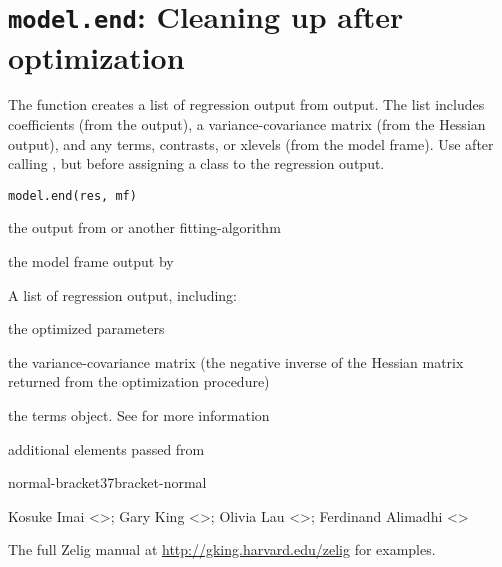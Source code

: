  \section{{\tt model.end}: Cleaning up after optimization}\label{ss:model.end}
\begin{Description}\relax
The  function creates a list of regression output from  
output.  The list includes coefficients (from the   output), a 
variance-covariance matrix (from the  Hessian output), and any terms, contrasts, or 
xlevels (from the model frame).  Use  after calling , but before 
assigning a 
class to the regression output.
\end{Description}
\begin{Usage}
\begin{verbatim}
model.end(res, mf)
\end{verbatim}
\end{Usage}
\begin{Arguments}
\begin{ldescription}
\item[\code{res}] the output from  or another fitting-algorithm
\item[\code{mf}] the model frame output by 
\end{ldescription}
\end{Arguments}
\begin{Value}
A list of regression output, including: 
\begin{ldescription}
\item[\code{coefficients}] the optimized parameters
\item[\code{variance}] the variance-covariance matrix (the negative
inverse of the Hessian matrix returned from the optimization
procedure)
\item[\code{terms}] the terms object.  See 
for more information
\item[\code{...}] additional elements passed from 
\end{ldescription}

normal-bracket37bracket-normal
\end{Value}
\begin{Author}\relax
Kosuke Imai <>; Gary King
<>; Olivia Lau <>; Ferdinand Alimadhi
<>
\end{Author}
\begin{SeeAlso}\relax
The full Zelig manual at \url{http://gking.harvard.edu/zelig} for examples.
\end{SeeAlso}



